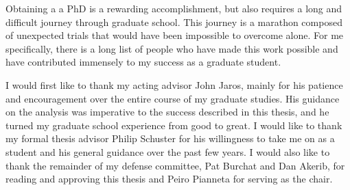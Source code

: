 \documentclass{report}
\begin{document}


Obtaining a a PhD is a rewarding accomplishment, but also requires a long and difficult journey through graduate school. This journey is a marathon composed of unexpected trials that would have been impossible to overcome alone. For me specifically, there is a long list of people who have made this work possible and have contributed immensely to my success as a graduate student.

I would first like to thank my acting advisor John Jaros, mainly for his patience and encouragement over the entire course of my graduate studies. His guidance on the analysis was imperative to the success described in this thesis, and he turned my graduate school experience from good to great. I would like to thank my formal thesis advisor Philip Schuster for his willingness to take me on as a student and his general guidance over the past few years. I would also like to thank the remainder of my defense committee, Pat Burchat and Dan Akerib, for reading and approving this thesis and Peiro Pianneta for serving as the chair.
\end{document}
